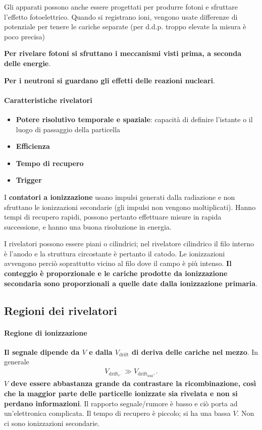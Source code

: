 \documentclass[a4paper,11pt,twoside,openany]{book}
\theoremstyle{definition}
\theoremstyle{plain}
\theoremstyle{plain}
\theoremstyle{definition}
\begin{document}
Gli apparati possono anche essere progettati per produrre fotoni e sfruttare l'effetto fotoelettrico. Quando si registrano ioni, vengono usate differenze di potenziale per tenere le cariche separate (per d.d.p. troppo elevate la misura è poco precisa)

\textbf{Per rivelare fotoni si sfruttano i meccanismi visti prima, a seconda delle energie}.

\textbf{Per i neutroni si guardano gli effetti delle reazioni nucleari}.

\paragraph{Caratteristiche rivelatori}
\begin{itemize}
\item \textbf{Potere risolutivo temporale e spaziale}: capacità di definire l'istante o il luogo di passaggio della particella
\item \textbf{Efficienza}
\item \textbf{Tempo di recupero} 
\item \textbf{Trigger}
\end{itemize}

I \textbf{contatori a ionizzazione} usano impulsi generati dalla radiazione e non sfruttano le ionizzazioni secondarie (gli impulsi non vengono moltiplicati). Hanno tempi di recupero rapidi, possono pertanto effettuare misure in rapida successione, e hanno una buona risoluzione in energia.

I rivelatori possono essere piani o cilindrici; nel rivelatore cilindrico il filo interno è l'anodo e la struttura circostante è pertanto il catodo. Le ionizzazioni avvengono perciò soprattutto vicino al filo dove il campo è più intenso. \textbf{Il conteggio è proporzionale e le cariche prodotte da ionizzazione secondaria sono proporzionali a quelle date dalla ionizzazione primaria}.

\subsection{Regioni dei rivelatori}
\paragraph{Regione di ionizzazione} \textbf{Il segnale dipende da $V$ e dalla $V_{\textrm{drift}}$ di deriva delle cariche nel mezzo}. In generale
\begin{equation}\begin{split}
V_{\textrm{drift}_{e^-}}\gg V_{\textrm{drift}_{\textrm{ioni}^+}}.
\end{split}\end{equation}
\textbf{$V$ deve essere abbastanza grande da contrastare la ricombinazione, così che la maggior parte delle particelle ionizzate sia rivelata e non si perdano informazioni}. Il rapporto segnale/rumore è basso e ciò porta ad un'elettronica complicata. Il tempo di recupero è piccolo; si ha una bassa $V$. Non ci sono ionizzazioni secondarie.
\end{document}
